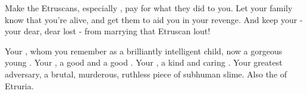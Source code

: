 \documentclass[blue]{Kos}
\begin{document}
Make the Etruscans, especially \cEtruriaKing{}, pay for what they did to you. Let your family know that you're alive, and get them to aid you in your revenge. And keep your \cBride{\sibling} - your dear, dear lost \cBride{\sibling} - from marrying that Etruscan lout!

\begin{contacts}
\contact{\cBride{}} Your \cBride{\sibling}, whom you remember as a brilliantly intelligent child, now a gorgeous young \cBride{\human}.
\contact{\cScythiaKing{}} Your \cScythiaKing{\parent}, a good \cScythiaKing{\human} and a good \cScythiaKing{\monarch}.
\contact{\cScythiaQueen{}} Your \cScythiaQueen{\parent}, a kind and caring \cScythiaQueen{\human}.
\contact{\cEtruriaKing{}} Your greatest adversary, a brutal, murderous, ruthless piece of subhuman slime. Also the \cEtruriaKing{\monarch} of Etruria.
\end{contacts} 
\end{document}

